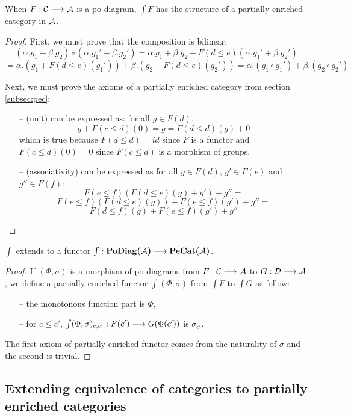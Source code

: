 \begin{prop}
When $F : \mathcal{C} \longrightarrow \mathcal{A}$ is a po-diagram, $\int F$ has the structure of a partially enriched category in $\mathcal{A}$.
\end{prop}

\begin{proof}
First, we must prove that the composition is bilinear: 
$$(\alpha.g_1+\beta.g_2)\circ (\alpha.g_1'+\beta.g_2') = \alpha.g_1 + \beta.g_2 + F(d\leq e)(\alpha.g_1'+\beta.g_2')$$ $$= \alpha.(g_1+F(d\leq e)(g_1')) + \beta.(g_2+F(d\leq e)(g_2')) = \alpha.(g_1\circ g_1') + \beta.(g_2\circ g_2')$$

Next, we must prove the axioms of a partially enriched category from section \ref{subsec:pec}:
		\begin{itemize}
			\item[--] (unit) can be expressed as: for all $ g \in F(d)$, $$g + F(c \leq d)(0) = g = F(d \leq d)(g) + 0$$ which is true because $F(d \leq d) = id$ since $F$ is a functor and $F(c \leq d)(0) = 0$ since $F(c \leq d)$ is a morphism of groups.
			\item[--] (associativity) can be expressed as for all $g \in F(d)$, $g' \in F(e)$ and $g'' \in F(f)$:
			$$F(e\leq f)(F(d\leq e)(g) + g') + g'' =$$
			$$F(e \leq f)(F(d\leq e)(g)) + F(e \leq f)(g') + g'' =$$
			$$F(d\leq f)(g) + F(e\leq f)(g') + g''$$
		\end{itemize}
\end{proof}

\begin{lemme}
$\int$ extends to a functor $\int : \textbf{PoDiag(}\mathcal{A}\textbf{)} \longrightarrow \textbf{PeCat(}\mathcal{A}\textbf{)}$.
\end{lemme}

\begin{proof}
If $(\Phi,\sigma)$ is a morphism of po-diagrams from $F : \mathcal{C} \longrightarrow \mathcal{A}$ to $G : \mathcal{D} \longrightarrow \mathcal{A}$, we define a partially enriched functor $\int(\Phi,\sigma)$ from $\int F$ to $\int G$ as follow:
	\begin{itemize}
		\item[--] the monotonous function part is $\Phi$,
		\item[--] for $c \leq c'$, $\int(\Phi,\sigma)_{c,c'} : F(c') \longrightarrow G(\Phi(c'))$ is $\sigma_{c'}$.
	\end{itemize}
	The first axiom of partially enriched functor comes from the naturality of $\sigma$ and the second is trivial.
\end{proof}

	
	
	
	\subsection{Extending equivalence of categories to partially enriched categories}
	
